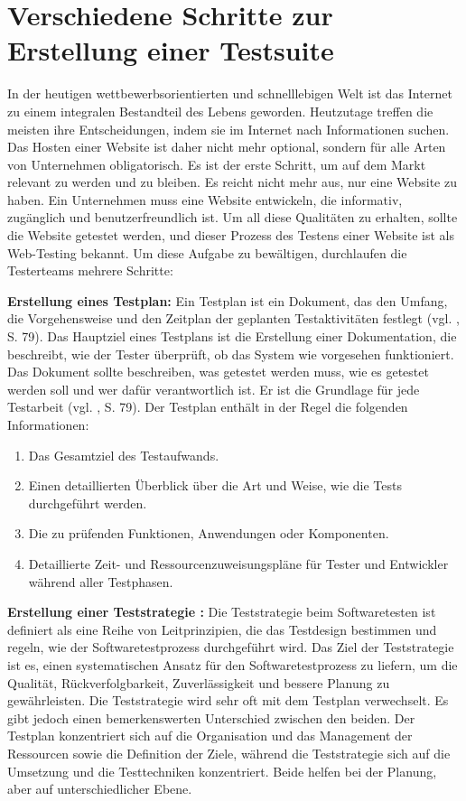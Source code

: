 \section{Verschiedene Schritte zur Erstellung einer Testsuite}\label{sec:verschiedene-schritte-zur-erstellung-einer-testsuite}

In der heutigen wettbewerbsorientierten und schnelllebigen
Welt ist das Internet zu einem integralen Bestandteil des Lebens
geworden. Heutzutage treffen die meisten ihre Entscheidungen,
indem sie im Internet nach Informationen suchen. Das Hosten einer
Website ist daher nicht mehr optional, sondern f\"ur alle Arten von
Unternehmen obligatorisch. Es ist der erste Schritt, um auf dem
Markt relevant zu werden und zu bleiben. Es reicht nicht mehr aus,
nur eine Website zu haben. Ein Unternehmen muss eine Website
entwickeln, die informativ, zug\"anglich und benutzerfreundlich ist.
Um all diese Qualit\"aten zu erhalten, sollte die Website getestet
werden, und dieser Prozess des Testens einer Website ist als Web-Testing
bekannt. Um diese Aufgabe zu bew\"altigen,
durchlaufen die Testerteams mehrere Schritte:

\textbf{Erstellung eines Testplan:} Ein Testplan ist ein Dokument, das den
Umfang, die Vorgehensweise und den Zeitplan der geplanten Testaktivit\"aten
festlegt (vgl. \cite{shultz2011software}, S. 79). Das Hauptziel eines Testplans
ist die Erstellung einer Dokumentation, die beschreibt, wie der Tester
\"uberpr\"uft, ob das System wie vorgesehen funktioniert. Das Dokument sollte
beschreiben, was getestet werden muss, wie es getestet werden soll und wer
daf\"ur verantwortlich ist. Er ist die Grundlage f\"ur jede Testarbeit
(vgl. \cite{shultz2011software}, S. 79). Der Testplan enth\"alt in der Regel die
folgenden Informationen:

\begin{enumerate}
    \item Das Gesamtziel des Testaufwands.
    \item Einen detaillierten \"Uberblick \"uber die Art und Weise, wie die Tests
    durchgef\"uhrt werden.
    \item Die zu pr\"ufenden Funktionen, Anwendungen oder Komponenten.
    \item Detaillierte Zeit- und Ressourcenzuweisungspl\"ane f\"ur Tester und
    Entwickler w\"ahrend aller Testphasen.
\end{enumerate}

\textbf{Erstellung einer Teststrategie :} Die Teststrategie beim Softwaretesten
ist definiert als eine Reihe von Leitprinzipien, die das Testdesign
bestimmen und regeln, wie der Softwaretestprozess durchgef\"uhrt wird. Das Ziel
der Teststrategie ist es, einen systematischen Ansatz f\"ur den
Softwaretestprozess zu liefern, um die Qualit\"at, R\"uckverfolgbarkeit,
Zuverl\"assigkeit und bessere Planung zu gew\"ahrleisten. Die
Teststrategie wird sehr oft mit dem Testplan verwechselt. Es gibt jedoch einen
bemerkenswerten Unterschied zwischen den beiden. Der Testplan konzentriert
sich auf die Organisation und das Management der Ressourcen sowie die
Definition der Ziele, w\"ahrend die Teststrategie sich auf die Umsetzung und die
Testtechniken konzentriert. Beide helfen bei der Planung, aber auf
unterschiedlicher Ebene.

